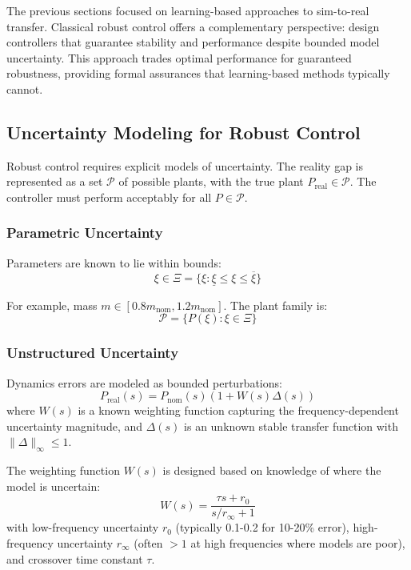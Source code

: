 The previous sections focused on learning-based approaches to sim-to-real transfer. Classical robust control offers a complementary perspective: design controllers that guarantee stability and performance despite bounded model uncertainty. This approach trades optimal performance for guaranteed robustness, providing formal assurances that learning-based methods typically cannot.

\subsection{Uncertainty Modeling for Robust Control}

Robust control requires explicit models of uncertainty. The reality gap is represented as a set $\mathcal{P}$ of possible plants, with the true plant $P_{\text{real}} \in \mathcal{P}$. The controller must perform acceptably for all $P \in \mathcal{P}$.

\subsubsection{Parametric Uncertainty}

Parameters are known to lie within bounds:
\begin{equation}
\xi \in \Xi = \{\xi : \underline{\xi} \leq \xi \leq \overline{\xi}\}
\end{equation}

For example, mass $m \in [0.8 m_{\text{nom}}, 1.2 m_{\text{nom}}]$. The plant family is:
\begin{equation}
\mathcal{P} = \{P(\xi) : \xi \in \Xi\}
\end{equation}

\subsubsection{Unstructured Uncertainty}

Dynamics errors are modeled as bounded perturbations:
\begin{equation}
P_{\text{real}}(s) = P_{\text{nom}}(s)(1 + W(s)\Delta(s))
\label{eq:multiplicative_uncertainty}
\end{equation}
where $W(s)$ is a known weighting function capturing the frequency-dependent uncertainty magnitude, and $\Delta(s)$ is an unknown stable transfer function with $\|\Delta\|_\infty \leq 1$.

The weighting function $W(s)$ is designed based on knowledge of where the model is uncertain:
\begin{equation}
W(s) = \frac{\tau s + r_0}{s/r_\infty + 1}
\end{equation}
with low-frequency uncertainty $r_0$ (typically 0.1-0.2 for 10-20\% error), high-frequency uncertainty $r_\infty$ (often $>1$ at high frequencies where models are poor), and crossover time constant $\tau$.

